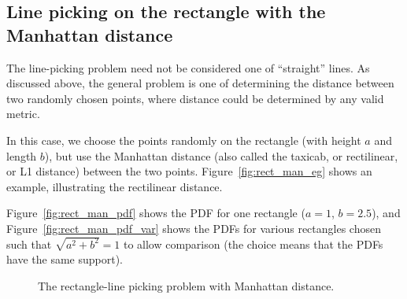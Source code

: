 \subsection{Line picking on the rectangle with the Manhattan distance}
\label{sec:rect_manhattan}

The line-picking problem need not be considered one of ``straight''
lines. As discussed above, the general problem is one of determining
the distance between two randomly chosen points, where distance could
be determined by any valid metric.

In this case, we choose the points randomly on the rectangle (with
height $a$ and length $b$), but use the Manhattan distance (also
called the taxicab, or rectilinear, or L1 distance) between the two
points. Figure~\ref{fig:rect_man_eg} shows an example, illustrating
the rectilinear distance.

Figure~\ref{fig:rect_man_pdf} shows the PDF for one rectangle ($a=1$,
$b=2.5$), and Figure~\ref{fig:rect_man_pdf_var} shows the PDFs for
various rectangles chosen such that $\sqrt{a^2 + b^2} = 1$ to allow
comparison (the choice means that the PDFs have the same support).

\begin{figure}[tbp]
  \begin{center}
    \hspace{6mm}
    \caption{The rectangle-line picking problem with Manhattan distance.}
  \end{center} 
\vspace{-4mm}
\end{figure}

